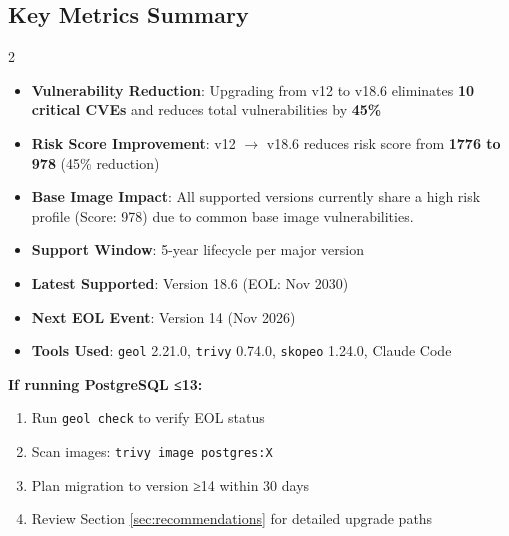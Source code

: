 \documentclass[11pt, a4paper]{article}
\begin{document}
\vspace{0.5cm}

\subsection*{Key Metrics Summary}

\begin{multicols}{2}
\begin{itemize}
    \item \textbf{Vulnerability Reduction}: Upgrading from v12 to v18.6 eliminates \textbf{10 critical CVEs} and reduces total vulnerabilities by \textbf{45\%}
    \item \textbf{Risk Score Improvement}: v12 $\rightarrow$ v18.6 reduces risk score from \textbf{1776 to 978} (45\% reduction)
    \item \textbf{Base Image Impact}: All supported versions currently share a high risk profile (Score: 978) due to common base image vulnerabilities.
    \item \textbf{Support Window}: 5-year lifecycle per major version
    \item \textbf{Latest Supported}: Version 18.6 (EOL: Nov 2030)
    \item \textbf{Next EOL Event}: Version 14 (Nov 2026)
    \item \textbf{Tools Used}: \texttt{geol} 2.21.0, \texttt{trivy} 0.74.0, \texttt{skopeo} 1.24.0, Claude Code
\end{itemize}
\end{multicols}

\vspace{0.5cm}

\begin{tcolorbox}[colback=lightorange!30, colframe=vuln-high, title=⚠️ Immediate Action Required, fonttitle=\bfseries]
\textbf{If running PostgreSQL ≤13:}
\begin{enumerate}
    \item Run \texttt{geol check} to verify EOL status
    \item Scan images: \texttt{trivy image postgres:X}
    \item Plan migration to version ≥14 within 30 days
    \item Review Section \ref{sec:recommendations} for detailed upgrade paths
\end{enumerate}
\end{tcolorbox}

\vspace{0.3cm}
\end{document}
